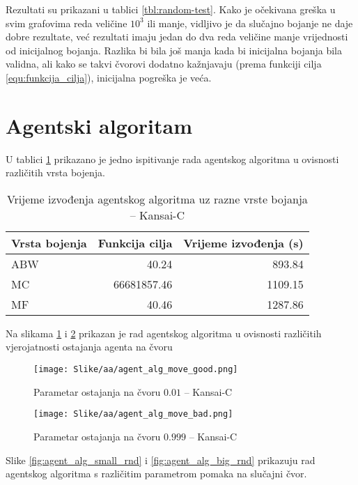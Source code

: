 \documentclass[times, utf8, diplomski, numeric]{fer}
\begin{document}
Rezultati su prikazani u tablici \ref{tbl:random-test}.
Kako je očekivana greška u svim grafovima reda veličine $10^3$ ili manje, vidljivo je da slučajno bojanje ne daje dobre rezultate, već rezultati imaju jedan do dva reda veličine manje vrijednosti od inicijalnog bojanja. Razlika bi bila još manja kada bi inicijalna bojanja bila validna, ali kako se takvi čvorovi dodatno kažnjavaju (prema funkciji cilja \ref{equ:funkcija_cilja}), inicijalna pogreška je veća.

\section{Agentski algoritam}

U tablici \ref{tbl:aa-cs1} prikazano je jedno ispitivanje rada agentskog algoritma u ovisnosti različitih vrsta bojenja.

\begin{table}[htb]
	\caption{Vrijeme izvođenja agentskog algoritma uz razne vrste bojanja -- Kansai-C}
	\label{tbl:aa-cs1}
	\centering
	\begin{tabular}{|l||r|r|} \hline
	Vrsta bojenja & Funkcija cilja & Vrijeme izvođenja (s)\\ \hline \hline
	ABW & 40.24 & 893.84 \\ \hline 
	MC & 66681857.46 & 1109.15 \\ \hline
	MF & 40.46 & 1287.86 \\ \hline
	\end{tabular}
\end{table}

Na slikama \ref{fig:agent_alg_move_good} i \ref{fig:agent_alg_move_bad} prikazan je rad agentskog algoritma u ovisnosti različitih vjerojatnosti ostajanja agenta na čvoru

\begin{figure}[htb]
	\texttt{[image: Slike/aa/agent\_alg\_move\_good.png]}
	\caption{Parametar ostajanja na čvoru $0.01$ -- Kansai-C}
	\label{fig:agent_alg_move_good}
\end{figure}

\begin{figure}[htb]
	\texttt{[image: Slike/aa/agent\_alg\_move\_bad.png]}
	\caption{Parametar ostajanja na čvoru $0.999$ -- Kansai-C}
	\label{fig:agent_alg_move_bad}
\end{figure}

Slike \ref{fig:agent_alg_small_rnd} i \ref{fig:agent_alg_big_rnd} prikazuju rad agentskog algoritma s različitim parametrom pomaka na slučajni čvor.
\end{document}
